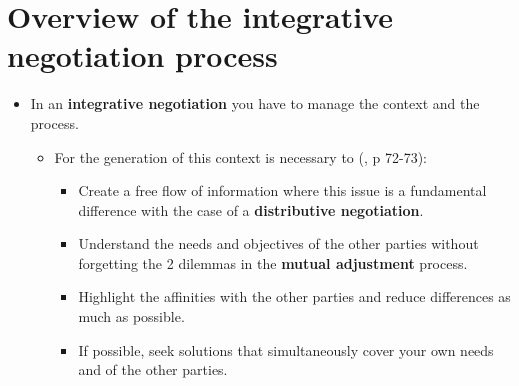 \documentclass[
  ignorenonframetext,
]{beamer}
\providecommand{\tightlist}{%
  \setlength{\itemsep}{0pt}\setlength{\parskip}{0pt}}\usepackage{longtable,booktabs,array}
\begin{document}
\section{Overview of the integrative negotiation
process}\label{overview-of-the-integrative-negotiation-process}

\begin{frame}{}
\label{section-11}
\begin{itemize}
\item
  In an \textbf{integrative negotiation} you have to manage the context
  and the process.

  \begin{itemize}
  \item
    For the generation of this context is necessary to
    (, p 72-73):

    \begin{itemize}
    \tightlist
    \item
      Create a free flow of information where this issue is a
      fundamental difference with the case of a \textbf{distributive
      negotiation}.
    \item
      Understand the needs and objectives of the other parties without
      forgetting the 2 dilemmas in the \textbf{mutual adjustment}
      process.
    \item
      Highlight the affinities with the other parties and reduce
      differences as much as possible.
    \item
      If possible, seek solutions that simultaneously cover your own
      needs and of the other parties.
    \end{itemize}
  \end{itemize}
\end{itemize}
\end{frame}
\end{document}
